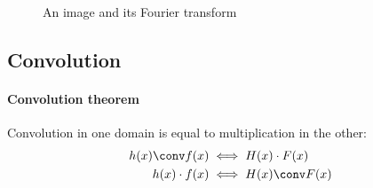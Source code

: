 \begin{figure}[htbp]
    \hfill
    \hfill
    \hfill
    \caption{An image and its Fourier transform}
\end{figure}

\subsection{Convolution}

\paragraph{Convolution theorem} Convolution in one domain is equal to multiplication in the other:
\begin{equation}\label{eq:convolution-theorem}
\begin{split}
    h(x) \conv f(x) &\iff H(x) \cdot F(x) \\
    h(x) \cdot f(x) &\iff H(x) \conv F(x)
\end{split}
\end{equation}

